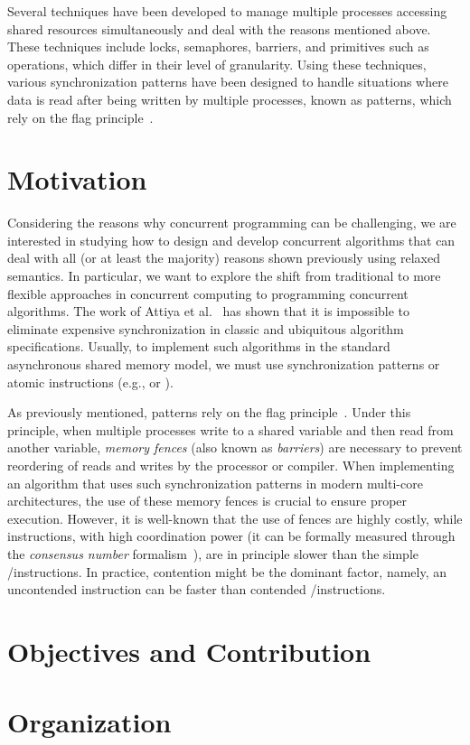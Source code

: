 Several techniques have been developed to manage multiple processes accessing shared resources simultaneously and deal with the reasons mentioned above. These techniques include locks, semaphores, barriers, and primitives such as \RMW operations, which differ in their level of granularity. Using these techniques, various synchronization patterns have been designed to handle situations where data is read after being written by multiple processes, known as \RAW patterns, which rely on the flag principle~\cite{DBLP_books_daglib_0020056}.


\section{\label{section:Motivation}Motivation}

Considering the reasons why concurrent programming can be challenging, we are interested in studying how to design and develop concurrent algorithms that can deal with all (or at least the majority) reasons shown previously using relaxed semantics. In particular, we want to explore the shift from traditional to more flexible approaches in concurrent computing to programming concurrent algorithms. The work of Attiya et al.~\cite{DBLP_conf_popl_AttiyaGHKMV11} has shown that it is impossible to eliminate expensive synchronization in classic and ubiquitous algorithm specifications. Usually, to implement such algorithms in the standard asynchronous shared memory model, we must use \RAW synchronization patterns or atomic \RMW instructions (e.g., \CAS or \TAS).

As previously mentioned, \RAW patterns rely on the flag principle~\cite{DBLP_books_daglib_0020056}. Under this principle, when multiple processes write to a shared variable and then read from another variable, \textit{memory fences} (also known as \textit{barriers}) are necessary to prevent reordering of reads and writes by the processor or compiler. When implementing an algorithm that uses such synchronization patterns in modern multi-core architectures, the use of these memory fences is crucial to ensure proper execution. However, it is well-known that the use of fences are highly costly, while \RMW instructions, with high coordination power (it can be formally measured through the \textit{consensus number} formalism~\cite{DBLP_journals_toplas_Herlihy91}), are in principle slower than the simple \R/\W instructions. In practice, contention might be the dominant factor, namely, an uncontended \RMW instruction can be faster than contended \R/\W instructions.

\section{\label{section:Objectives}Objectives and Contribution}
\section{\label{section:Organization}Organization}
